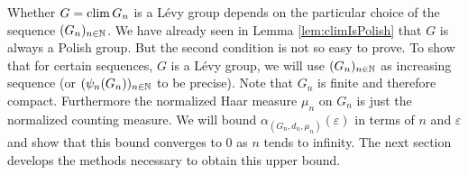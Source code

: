 Whether $G=\operatorname{clim} G_n$ is a L\'evy group depends on the particular choice of the sequence $(G_n)_{n\in\mathbb{N}}$. We have already seen in Lemma \ref{lem:climIsPolish} that $G$ is always a Polish group. But the second condition is not so easy to prove.
To show that for certain sequences, $G$ is a L\'evy group, we will use $(G_n)_{n\in\mathbb{N}}$ as increasing sequence (or $(\psi_n(G_n))_{n\in\mathbb{N}}$ to be precise). Note that $G_n$ is finite and therefore compact. Furthermore the normalized Haar measure $\mu_n$ on $G_n$ is just the normalized counting measure. We will bound $\alpha_{(G_n,d_n,\mu_n)}(\varepsilon)$ in terms of $n$ and $\varepsilon$ and show that this bound converges to 0 as $n$ tends to infinity. 
The next section develops the methods necessary to obtain this upper bound.

